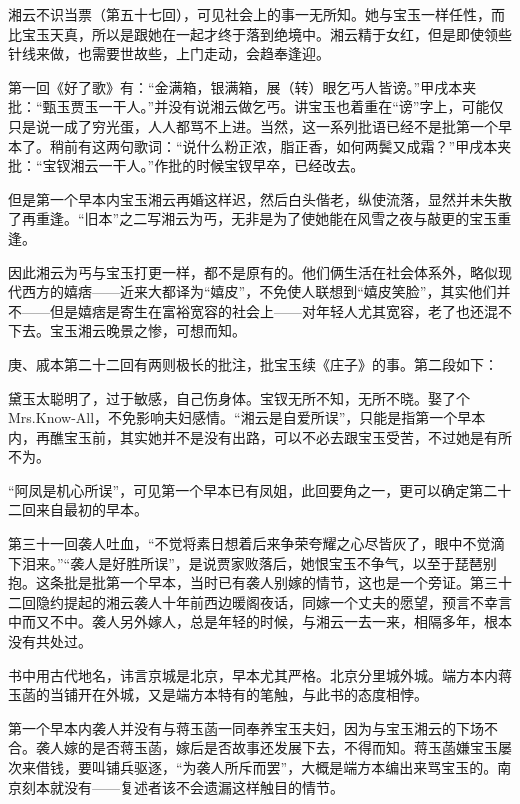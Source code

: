 \par 湘云不识当票（第五十七回），可见社会上的事一无所知。她与宝玉一样任性，而比宝玉天真，所以是跟她在一起才终于落到绝境中。湘云精于女红，但是即使领些针线来做，也需要世故些，上门走动，会趋奉逢迎。
\par 第一回《好了歌》有：“金满箱，银满箱，展（转）眼乞丐人皆谤。”甲戌本夹批：“甄玉贾玉一干人。”并没有说湘云做乞丐。讲宝玉也着重在“谤”字上，可能仅只是说一成了穷光蛋，人人都骂不上进。当然，这一系列批语已经不是批第一个早本了。稍前有这两句歌词：“说什么粉正浓，脂正香，如何两鬓又成霜？”甲戌本夹批：“宝钗湘云一干人。”作批的时候宝钗早卒，已经改去。
\par 但是第一个早本内宝玉湘云再婚这样迟，然后白头偕老，纵使流落，显然并未失散了再重逢。“旧本”之二写湘云为丐，无非是为了使她能在风雪之夜与敲更的宝玉重逢。
\par 因此湘云为丐与宝玉打更一样，都不是原有的。他们俩生活在社会体系外，略似现代西方的嬉痞——近来大都译为“嬉皮”，不免使人联想到“嬉皮笑脸”，其实他们并不——但是嬉痞是寄生在富裕宽容的社会上——对年轻人尤其宽容，老了也还混不下去。宝玉湘云晚景之惨，可想而知。
\par 庚、戚本第二十二回有两则极长的批注，批宝玉续《庄子》的事。第二段如下：
\par 黛玉太聪明了，过于敏感，自己伤身体。宝钗无所不知，无所不晓。娶了个Mrs.Know-All，不免影响夫妇感情。“湘云是自爱所误”，只能是指第一个早本内，再醮宝玉前，其实她并不是没有出路，可以不必去跟宝玉受苦，不过她是有所不为。
\par “阿凤是机心所误”，可见第一个早本已有凤姐，此回要角之一，更可以确定第二十二回来自最初的早本。
\par 第三十一回袭人吐血，“不觉将素日想着后来争荣夸耀之心尽皆灰了，眼中不觉滴下泪来。”“袭人是好胜所误”，是说贾家败落后，她恨宝玉不争气，以至于琵琶别抱。这条批是批第一个早本，当时已有袭人别嫁的情节，这也是一个旁证。第三十二回隐约提起的湘云袭人十年前西边暖阁夜话，同嫁一个丈夫的愿望，预言不幸言中而又不中。袭人另外嫁人，总是年轻的时候，与湘云一去一来，相隔多年，根本没有共处过。
\par 书中用古代地名，讳言京城是北京，早本尤其严格。北京分里城外城。端方本内蒋玉菡的当铺开在外城，又是端方本特有的笔触，与此书的态度相悖。
\par 第一个早本内袭人并没有与蒋玉菡一同奉养宝玉夫妇，因为与宝玉湘云的下场不合。袭人嫁的是否蒋玉菡，嫁后是否故事还发展下去，不得而知。蒋玉菡嫌宝玉屡次来借钱，要叫铺兵驱逐，“为袭人所斥而罢”，大概是端方本编出来骂宝玉的。南京刻本就没有——复述者该不会遗漏这样触目的情节。
